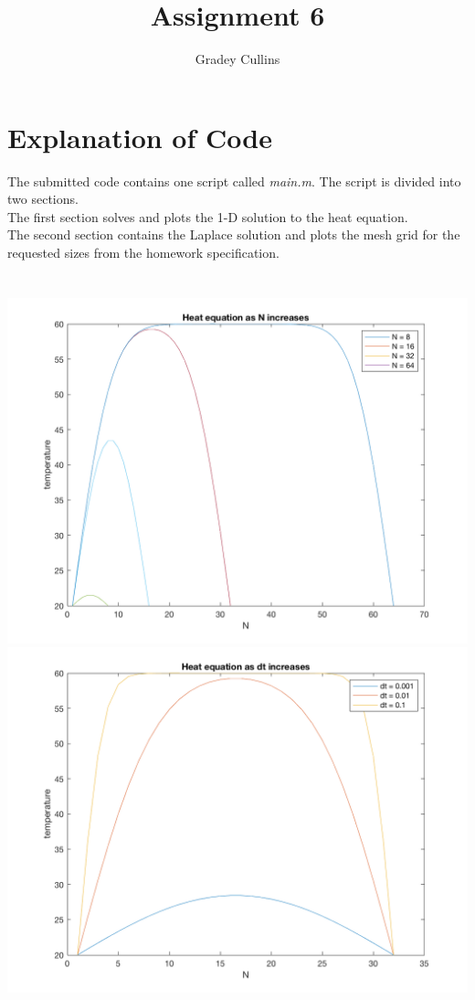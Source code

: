 \documentclass[10pt,a4paper]{article}
\author{Gradey Cullins}
\title{Assignment 6}
\begin{document}
\maketitle

\section*{Explanation of Code}
The submitted code contains one script called \emph{main.m}. The script is divided into two sections. \\

\noindent
The first section solves and plots the 1-D solution to the heat equation. \\

\noindent
The second section contains the Laplace solution and plots the mesh grid for the requested sizes from the homework specification.

\section{}

\includegraphics[scale=0.2]{fig_1.png}
\includegraphics[scale=0.2]{fig_2.png}
\end{document}
